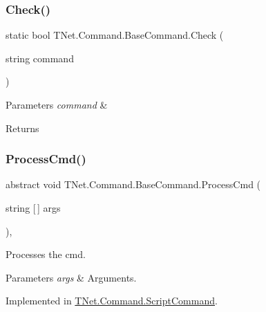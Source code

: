 \subsubsection{\texorpdfstring{Check()}{Check()}}
{\footnotesize\ttfamily static bool T\+Net.\+Command.\+Base\+Command.\+Check (\begin{DoxyParamCaption}\item[{string}]{command }\end{DoxyParamCaption})\hspace{0.3cm}{\ttfamily [static]}}






\begin{DoxyParams}{Parameters}
{\em command} & \\
\hline
\end{DoxyParams}
\begin{DoxyReturn}{Returns}

\end{DoxyReturn}
\mbox{\label{class_t_net_1_1_command_1_1_base_command_a7074bfedc9614ab46da40606cfefa4e0}} 
\subsubsection{\texorpdfstring{Process\+Cmd()}{ProcessCmd()}}
{\footnotesize\ttfamily abstract void T\+Net.\+Command.\+Base\+Command.\+Process\+Cmd (\begin{DoxyParamCaption}\item[{string \mbox{[}$\,$\mbox{]}}]{args }\end{DoxyParamCaption})\hspace{0.3cm}{\ttfamily [protected]}, {}}



Processes the cmd. 


\begin{DoxyParams}{Parameters}
{\em args} & Arguments.\\
\hline
\end{DoxyParams}


Implemented in \mbox{\hyperlink{class_t_net_1_1_command_1_1_script_command_a69b8d968f851b261e006e233de4ebee0}{T\+Net.\+Command.\+Script\+Command}}.

